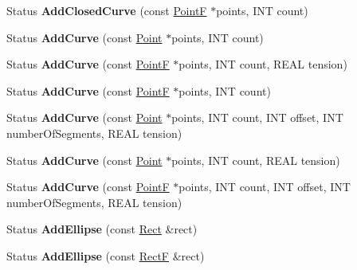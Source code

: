 \begin{DoxyCompactItemize}
Status {\bfseries Add\+Closed\+Curve} (const \hyperlink{struct_point_f}{PointF} $\ast$points, I\+NT count)
\item 
\mbox{\label{class_graphics_path_a042fc19b402f9e74d1bc5836577cd714}} 
Status {\bfseries Add\+Curve} (const \hyperlink{struct_point}{Point} $\ast$points, I\+NT count)
\item 
\mbox{\label{class_graphics_path_a2e7813192b55a65d78449224da69f130}} 
Status {\bfseries Add\+Curve} (const \hyperlink{struct_point_f}{PointF} $\ast$points, I\+NT count, R\+E\+AL tension)
\item 
\mbox{\label{class_graphics_path_a217384245b85b46a4aad91cc942f21e1}} 
Status {\bfseries Add\+Curve} (const \hyperlink{struct_point_f}{PointF} $\ast$points, I\+NT count)
\item 
\mbox{\label{class_graphics_path_a16088b0aba5a66f1f80acc84988d9128}} 
Status {\bfseries Add\+Curve} (const \hyperlink{struct_point}{Point} $\ast$points, I\+NT count, I\+NT offset, I\+NT number\+Of\+Segments, R\+E\+AL tension)
\item 
\mbox{\label{class_graphics_path_a84adc52f361cb436559031417642806f}} 
Status {\bfseries Add\+Curve} (const \hyperlink{struct_point}{Point} $\ast$points, I\+NT count, R\+E\+AL tension)
\item 
\mbox{\label{class_graphics_path_a52a0c8d8ee4c4cb8a64345bc21929fa1}} 
Status {\bfseries Add\+Curve} (const \hyperlink{struct_point_f}{PointF} $\ast$points, I\+NT count, I\+NT offset, I\+NT number\+Of\+Segments, R\+E\+AL tension)
\item 
\mbox{\label{class_graphics_path_a890dfaf3403e820fa7aa065a0b195794}} 
Status {\bfseries Add\+Ellipse} (const \hyperlink{struct_rect}{Rect} \&rect)
\item 
\mbox{\label{class_graphics_path_a6cb5430af0f80fd56b171fc35164425d}} 
Status {\bfseries Add\+Ellipse} (const \hyperlink{struct_rect_f}{RectF} \&rect)
\item 
\mbox{\label{class_graphics_path_a6ae92f4bcf55dead8f8871dc3c8f9f81}} 

\end{DoxyCompactItemize}
